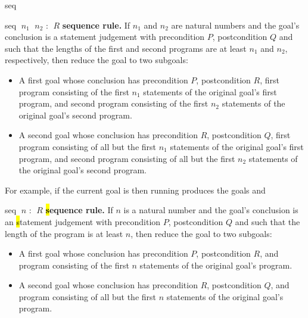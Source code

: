 \begin{tactic}{seq}
  \begin{tsyntax}{seq $\;n_1$ $\;n_2$ : $\;R$}
    \textbf{\prhl sequence rule.} If $n_1$ and $n_2$ are natural
    numbers and the goal's conclusion is a \prhl statement judgement
    with precondition $P$, postcondition $Q$ and such that the lengths
    of the first and second programs are at least $n_1$ and $n_2$,
    respectively, then reduce the goal to two subgoals:
    \begin{itemize}
    \item A first goal whose conclusion has precondition $P$,
      postcondition $R$, first program consisting of the first $n_1$
      statements of the original goal's first program, and second
      program consisting of the first $n_2$ statements of the original
      goal's second program.

    \item A second goal whose conclusion has precondition $R$,
      postcondition $Q$, first program consisting of all but the first
      $n_1$ statements of the original goal's first program, and
      second program consisting of all but the first $n_2$ statements
      of the original goal's second program.
    \end{itemize}

  \bigskip
  For example, if the current goal is
   then
  running 
  produces the goals
  and
  \end{tsyntax}

  \begin{tsyntax}{seq $\;n$ : $\;R$}
  \textbf{\hl sequence rule.} If $n$ is a natural
    number and the goal's conclusion is an \hl statement judgement
    with precondition $P$, postcondition $Q$ and such that the length
    of the program is at least $n$, then reduce the goal to two subgoals:
    \begin{itemize}
    \item A first goal whose conclusion has precondition $P$,
      postcondition $R$, and program consisting of the first $n$
      statements of the original goal's program.

    \item A second goal whose conclusion has precondition $R$,
      postcondition $Q$, and program consisting of all but the first
      $n$ statements of the original goal's program.
    \end{itemize}


\end{tsyntax}
\end{tactic}
